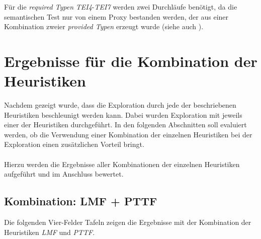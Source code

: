 \begin{multicols}{2}
\columnbreak
{}
\end{multicols}
\begin{multicols}{2}
\columnbreak
{}
\end{multicols}
\begin{multicols}{2}
\columnbreak
{}
\end{multicols}
\noindent
Für die \emph{required Typen} \emph{TEI4}-\emph{TEI7} werden zwei Durchläufe benötigt, da die semantischen Test nur von einem Proxy bestanden werden, der aus einer Kombination zweier \emph{provided Typen} erzeugt wurde (siehe auch ).





\section{Ergebnisse für die Kombination der Heuristiken}
Nachdem gezeigt wurde, dass die Exploration durch jede der beschriebenen Heuristiken beschleunigt werden kann. Dabei wurden Exploration mit jeweils einer der Heuristiken durchgeführt. In den folgenden Abschnitten soll evaluiert werden, ob die Verwendung einer Kombination der einzelnen Heuristiken bei der Exploration einen zusätzlichen Vorteil bringt.
\\\\
Hierzu werden die Ergebnisse aller Kombinationen der einzelnen Heuristiken aufgeführt und im Anschluss bewertet.
\subsection{Kombination: LMF + PTTF}
Die folgenden Vier-Felder Tafeln zeigen die Ergebnisse mit der Kombination der Heuristiken \emph{LMF} und \emph{PTTF}.
\begin{multicols}{3}
\columnbreak
{}\columnbreak
{}
\end{multicols}

